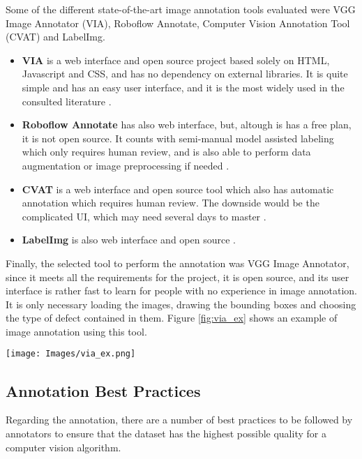 Some of the different state-of-the-art image annotation tools evaluated were VGG Image Annotator (VIA), Roboflow Annotate, Computer Vision Annotation Tool (CVAT) and LabelImg.
\begin{itemize}[]
    \item[\tiny$\blacksquare$]\textbf{VIA} is a web interface and open source project based solely on HTML, Javascript and CSS, and has no dependency on external libraries. It is quite simple and has an easy user interface, and it is the most widely used in the consulted literature \cite{via}.
    \item[\tiny$\blacksquare$] \textbf{Roboflow Annotate} has also web interface, but, altough is has a free plan, it is not open source. It counts with semi-manual model assisted labeling which only requires human review, and is also able to perform data augmentation or image preprocessing if needed \cite{roboflow}. 
    \item[\tiny$\blacksquare$] \textbf{CVAT} is a web interface and open source tool which also has automatic annotation which requires human review. The downside would be the complicated UI, which may need several days to master \cite{cvat}.
    \item[\tiny$\blacksquare$] \textbf{LabelImg} is also web interface and open source \cite{lablimg}.
\end{itemize}

Finally, the selected tool to perform the annotation was VGG Image Annotator, since it meets all the requirements for the project, it is open source, and its user interface is rather fast to learn for people with no experience in image annotation. It is only necessary loading the images, drawing the bounding boxes and choosing the type of defect contained in them. Figure \ref{fig:via_ex} shows an example of image annotation using this tool.

\begin{figure*}[htbp]
        \centering            
        \texttt{[image: Images/via\_ex.png]}
        \caption[Image annotation tool VIA.]
        {\small Image annotation tool VIA.} 
        \label{fig:via_ex}
    \end{figure*}


\subsection{Annotation Best Practices}
\label{sec:bestpractices}
Regarding the annotation, there are a number of best practices to be followed by annotators to ensure that the dataset has the highest possible quality for a computer vision algorithm.

